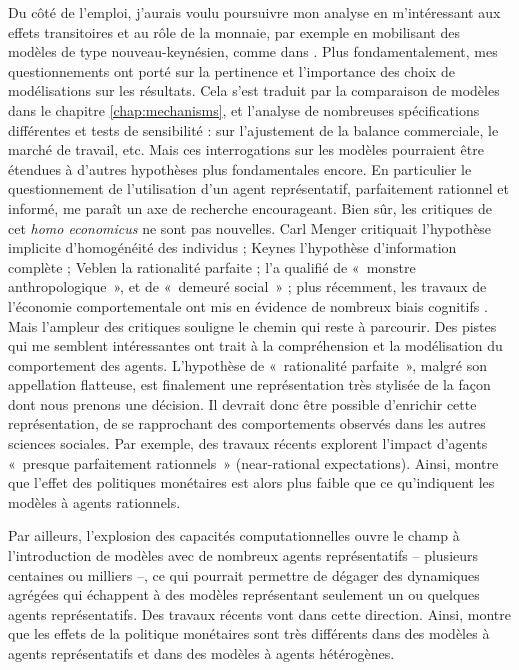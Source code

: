 Du côté de l’emploi, j’aurais voulu poursuivre mon analyse en m’intéressant aux effets transitoires et au rôle de la monnaie, par exemple en mobilisant des modèles de type nouveau-keynésien, comme dans \citet{Blanchard2007}. 
Plus fondamentalement, mes questionnements ont porté sur la pertinence et l’importance des choix de modélisations sur les résultats. Cela s’est traduit par la comparaison de modèles dans le chapitre \ref{chap:mechanisms}, et l’analyse de nombreuses spécifications différentes et tests de sensibilité : sur l’ajustement de la balance commerciale, le marché de travail, etc. 
Mais ces interrogations sur les modèles pourraient être étendues à d'autres hypothèses plus fondamentales encore. En particulier le questionnement de l’utilisation d’un agent représentatif, parfaitement rationnel et informé, me paraît un axe de recherche encourageant. Bien sûr, les critiques de cet \textit{homo economicus} ne sont pas nouvelles. Carl Menger critiquait l’hypothèse implicite d’homogénéité des individus ; Keynes l’hypothèse d’information complète ; Veblen la rationalité parfaite ; \citet{Bourdieu1977} l’a qualifié de «~monstre anthropologique~», et \citet{Sen2012} de «~demeuré social~» ; plus récemment, les travaux de l’économie comportementale ont mis en évidence de nombreux biais cognitifs \citep{Thaler2009,Kahneman2011}.
Mais l’ampleur des critiques souligne le chemin qui reste à parcourir. Des pistes qui me semblent intéressantes ont trait à la compréhension et la modélisation du comportement des agents. L'hypothèse de «~rationalité parfaite~», malgré son appellation flatteuse, est finalement une représentation très stylisée de la façon dont nous prenons une décision. Il devrait donc être possible d'enrichir cette représentation, de se rapprochant des comportements observés dans les autres sciences sociales. Par exemple, des travaux récents explorent l’impact d’agents «~presque parfaitement rationnels~» (near-rational expectations). Ainsi, \citet{Farhi2016} montre que l’effet des politiques monétaires est alors plus faible que ce qu’indiquent les modèles à agents rationnels.

Par ailleurs, l’explosion des capacités computationnelles ouvre le champ à l’introduction de modèles avec de nombreux agents représentatifs – plusieurs centaines ou milliers –, ce qui pourrait permettre de dégager des dynamiques agrégées qui échappent à des modèles représentant seulement un ou quelques agents représentatifs. Des travaux récents vont dans cette direction. Ainsi, \citet{Kaplan2016} montre que les effets de la politique monétaires sont très différents dans des modèles à agents représentatifs et dans des modèles à agents hétérogènes. 

